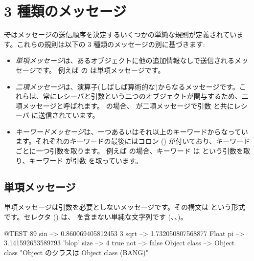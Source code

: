 \documentclass[a4paper,10pt,twoside]{book}
\begin{document}
\section{3 種類のメッセージ}

\st ではメッセージの送信順序を決定するいくつかの単純な規則が定義されています。これらの規則は以下の 3 種類のメッセージの別に基づきます:
\begin{itemize}
\item \emph{単項メッセージ}は、あるオブジェクトに他の追加情報なしで送信されるメッセージです。 例えば  の  は単項メッセージです。
\item  \emph{二項メッセージ}は、演算子(しばしば算術的な)からなるメッセージです。これらは、常にレシーバと引数という二つのオブジェクトが関与するため、二項メッセージと呼ばれます。 の場合、\ct{+} が二項メッセージで引数  と共にレシーバ  に送信されています。
\item  \emph{キーワードメッセージ}は、一つあるいはそれ以上のキーワードからなっています。それぞれのキーワードの最後にはコロン (\ct{:}) が付いており、キーワードごとに一つ引数を取ります。
例えば  の場合、キーワード  は  という引数を取り、キーワード  が引数  を取っています。
\end{itemize}

\subsection{単項メッセージ}
単項メッセージは引数を必要としないメッセージです。その構文は  という形式です。セレクタ () は、\ct{:} を含まない単純な文字列です (\eg {}、、)。
\begin{code}{@TEST}
89 sin           --> 0.860069405812453
3 sqrt           --> 1.732050807568877
Float pi         --> 3.141592653589793
'blop' size     --> 4
true not        --> false
Object class --> Object class  "Object のクラスは Object class (BANG)"
\end{code}


\end{document}
